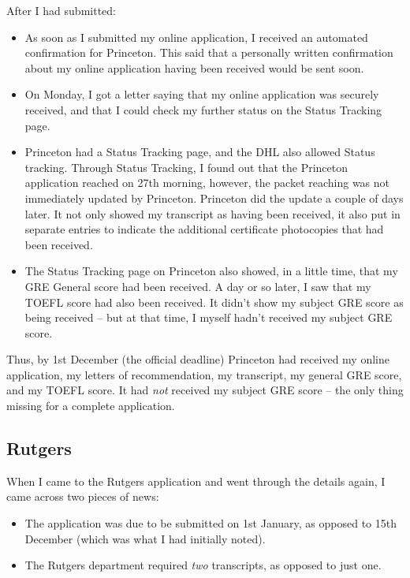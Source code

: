 \documentclass[a4paper]{amsart}
\begin{document}
After I had submitted:

\begin{itemize}

\item As soon as I submitted my online application, I received an
  automated confirmation for Princeton. This said that a personally
  written confirmation about my online application having been received
  would be sent soon.

\item On Monday, I got a letter saying that my online application was
  securely received, and that I could check my further status
  on the Status Tracking page.

\item Princeton had a Status Tracking page, and the DHL also allowed
  Status tracking. Through Status Tracking, I found out that the
  Princeton application reached on 27th morning, however, the packet
  reaching was not immediately updated by Princeton. Princeton did the
  update a couple of days later. It not only showed my transcript
  as having been received, it also put in separate entries to indicate
  the additional certificate photocopies that had been received.

\item The Status Tracking page on Princeton also showed,
  in a little time, that my GRE General score had been received.
  A day or so later, I saw that my TOEFL score had also been received.
  It didn't show my subject GRE score as being received -- but at that time,
  I myself hadn't received my subject GRE score.

\end{itemize}

Thus, by 1st December (the official deadline) Princeton had received
my online application, my letters of recommendation, my transcript, my
general GRE score, and my TOEFL score. It had {\em not} received my
subject GRE score -- the only thing missing for a complete application.

\subsection{Rutgers}

When I came to the Rutgers application and went through the details again,
I came across two pieces of news:

\begin{itemize}

\item The application was due to be submitted on 1st January, as
  opposed to 15th December (which was what I had initially noted).

\item The Rutgers department required {\em two} transcripts, as opposed
  to just one.

\end{itemize}
\end{document}

